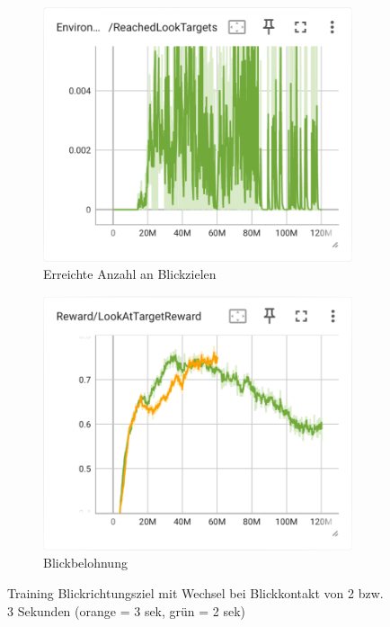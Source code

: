 \begin{figure}[H]
\begin{subfigure}{.49\textwidth}
      \label{fig:117_119_reach_target}
    \end{subfigure}
    \begin{subfigure}{.49\textwidth}
      \centering  
      \includegraphics[width=\textwidth]{img/117_119_reach_look_target}
      \caption{Erreichte Anzahl an Blickzielen}
      \label{fig:117_119_reach_look_target}
    \end{subfigure}
    \begin{subfigure}{.49\textwidth}
      \centering  
      \includegraphics[width=\textwidth]{img/117_119_look_reward}
      \caption{Blickbelohnung}
      \label{fig:117_119_look_reward}
    \end{subfigure}
  \caption{Training Blickrichtungsziel mit Wechsel bei Blickkontakt von 2 bzw. 3 Sekunden (orange = 3 sek, grün = 2 sek)}
  \label{fig:training_blickrichtungsziel_wechsel_spherecast}
\end{figure}